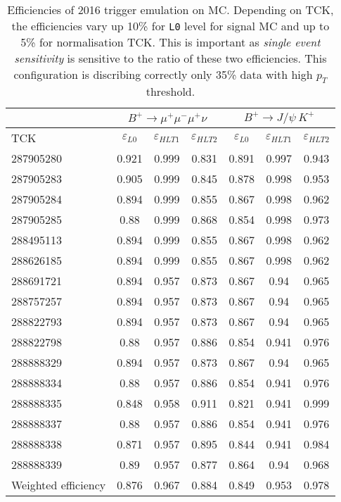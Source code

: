 \begin{table}[ht]
\footnotesize
\begin{center}
\begin{tabular}{ l |  c  c  c | c  c  c }
 \multicolumn{1}{c|}{} & \multicolumn{3}{c|}{$B^{+} \rightarrow \mu^{+} \mu^{-} \mu^{+} \nu$ } & \multicolumn{3}{c}{$B^{+} \rightarrow J/\psi\ K^{+}$} \\ \hline
 TCK & $\varepsilon_{L0}$ & $\varepsilon_{HLT1}$ & $\varepsilon_{HLT2}$ & $\varepsilon_{L0}$ & $\varepsilon_{HLT1}$ & $\varepsilon_{HLT2}$ \\
\hline
287905280 & 0.921 & 0.999 & 0.831 & 0.891 & 0.997 & 0.943 \\
287905283 & 0.905 & 0.999 & 0.845 & 0.878 & 0.998 & 0.953 \\
287905284 & 0.894 & 0.999 & 0.855 & 0.867 & 0.998 & 0.962 \\
287905285 & 0.88 & 0.999 & 0.868 & 0.854 & 0.998 & 0.973 \\
288495113 & 0.894 & 0.999 & 0.855 & 0.867 & 0.998 & 0.962 \\
288626185 & 0.894 & 0.999 & 0.855 & 0.867 & 0.998 & 0.962 \\
288691721 & 0.894 & 0.957 & 0.873 & 0.867 & 0.94 & 0.965 \\
288757257 & 0.894 & 0.957 & 0.873 & 0.867 & 0.94 & 0.965 \\
288822793 & 0.894 & 0.957 & 0.873 & 0.867 & 0.94 & 0.965 \\
288822798 & 0.88 & 0.957 & 0.886 & 0.854 & 0.941 & 0.976 \\
288888329 & 0.894 & 0.957 & 0.873 & 0.867 & 0.94 & 0.965 \\
288888334 & 0.88 & 0.957 & 0.886 & 0.854 & 0.941 & 0.976 \\
288888335 & 0.848 & 0.958 & 0.911 & 0.821 & 0.941 & 0.999 \\
288888337 & 0.88 & 0.957 & 0.886 & 0.854 & 0.941 & 0.976 \\
288888338 & 0.871 & 0.957 & 0.895 & 0.844 & 0.941 & 0.984 \\
288888339 & 0.89 & 0.957 & 0.877 & 0.864 & 0.94 & 0.968 \\
\hline
Weighted efficiency & 0.876 & 0.967 & 0.884 & 0.849 & 0.953 & 0.978 \\
\hline
\end{tabular}
\end{center}
\caption{Efficiencies of 2016 trigger emulation on MC. Depending on TCK, the efficiencies vary up 10\% for \texttt{L0} level for signal MC and up to 5\% for normalisation TCK. This is important as \textit{single event sensitivity} is sensitive to the ratio of these two efficiencies. This configuration is discribing correctly only 35\% data with high $p_{T}$ threshold.}
\label{tab:L0andHLT1Calib}
\end{table}



